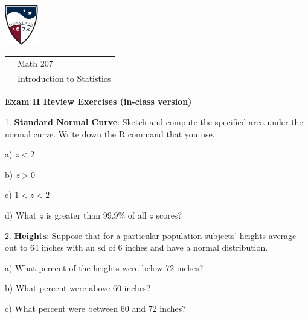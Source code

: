 \documentclass[10pt]{article}
\begin{document}
\pagestyle{empty}


\href{http://www.su.edu}{\includegraphics[height=1.75cm]{sulogo.eps}}
\vspace{-1.69cm}

\hfill {\small
\begin{tabular}{cl}
& Math 207\\
& Introduction to Statistics\\
\end{tabular}
}
\setlength{\baselineskip}{1.05\baselineskip}
\bigskip

\begin{center}
\textbf{\large  Exam II Review Exercises (in-class version)}
\end{center}
\medskip

1. \textbf{Standard Normal Curve}:  Sketch and compute the specified area under the normal curve. 
Write down the R command that you use.

\hspace{10pt} a) $z < 2$
\vspace{.4in}

\hspace{10pt} b) $z > 0$
\vspace{.5in}

\hspace{10pt} c) $1 < z < 2$
\vspace{.5in}

\hspace{10pt} d) What $z$ is greater than 99.9\% of all $z$ scores?
\vspace{.5in}

2. \textbf{Heights}:  Suppose that for a particular population
subjects' heights average out to 64 inches with an sd of 6 inches and have
a normal distribution.

\hspace{10pt} a) What percent of the heights were below 72 inches?
\vspace{1.1in}

\hspace{10pt} b) What percent were above 60 inches?
\vspace{1.1in}

\hspace{10pt} c) What percent were between 60 and 72 inches?
\vspace{1.1in}
\end{document}
